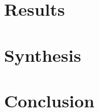 \documentclass{article}
\begin{document}
  \section{Results}

 

  \section{Synthesis}

 

  \section{Conclusion}
\end{document}
